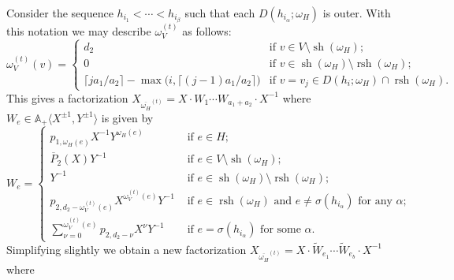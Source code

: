 \documentclass{amsart}
\renewcommand{\AA}{\mathbb{A}}
\newcommand{\rsh}{\operatorname{rsh}}
\newcommand{\sh}{\operatorname{sh}}
\begin{document}
Consider the sequence $h_{i_1}<\cdots<h_{i_\beta}$ such that each $D(h_{i_\alpha};\omega_H)$ is outer.  With this notation we may describe $\omega_V^{(t)}$ as follows:
\[\omega_V^{(t)}(v)=\begin{cases}d_2 & \text{if $v\in V\setminus\sh(\omega_H)$;}\\ 0 & \text{if $v\in\sh(\omega_H)\setminus\rsh(\omega_H)$;}\\ \lceil ja_1/a_2\rceil-\max\big(i,\lceil (j-1)a_1/a_2\rceil\big) & \text{if $v=v_j\in D(h_i;\omega_H)\cap\rsh(\omega_H)$.}\end{cases}\]
This gives a factorization $X_{\overline{\omega_H}^{(t)}}=X\cdot W_1\cdots W_{a_1+a_2}\cdot X^{-1}$ where $W_e\in\AA_+\langle X^{\pm1},Y^{\pm1}\rangle$ is given by
\[W_e=\begin{cases}p_{1,\omega_H(e)}X^{-1}Y^{\omega_H(e)} & \text{ if $e\in H$;}\\ \overline{P}_2(X)Y^{-1} & \text{ if $e\in V\setminus\sh(\omega_H);$}\\ Y^{-1} & \text{ if $e\in\sh(\omega_H)\setminus\rsh(\omega_H)$;}\\ p_{2,d_2-\omega_V^{(t)}(e)}X^{\omega_V^{(t)}(e)}Y^{-1} & \text{ if $e\in\rsh(\omega_H)$ and $e\ne\sigma(h_{i_\alpha})$ for any $\alpha$;}\\ \sum\limits_{\nu=0}^{\omega_V^{(t)}(e)}p_{2,d_2-\nu}X^\nu Y^{-1} & \text{ if $e=\sigma(h_{i_\alpha})$ for some $\alpha$.}\end{cases}\]
Simplifying slightly we obtain a new factorization $X_{\overline{\omega_H}^{(t)}}=X\cdot\tilde W_{e_1}\cdots\tilde W_{e_b}\cdot X^{-1}$ where
\end{document}
